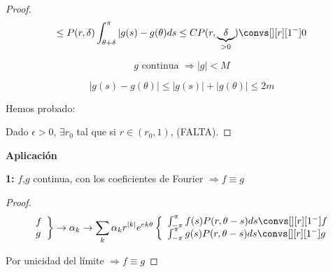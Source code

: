\begin{itemize}
\begin{theorem}
\begin{proof}
					\[\leq P(r, \delta) \int^{\pi}_{\theta+\delta} |g(s) - g(\theta) ds \leq C P(r, \underbrace{\delta}_{> 0}) \convs[][r][1^-] 0  \]

					\[g \text{ continua } \Rightarrow |g| < M \]

					\[ |g(s)  - g(\theta)| \leq |g(s)| + | g(\theta) | \leq 2m \]


					Hemos probado:

					Dado $\epsilon > 0$, $\exists r_0$ tal que si $r \in (r_0,1)$, (FALTA).

				\end{proof}

			\end{theorem}

			\textbf{Aplicación}

			\textbf{1:} $f$,$g$ continua, con los  coeficientes de Fourier $\Rightarrow f \equiv g$

			\begin{proof}
				\[
					\left. \begin{array}{l}
					f \\
					g
					\end{array} \right\} \rightarrow \alpha_k \rightarrow \sum_k \alpha_k r^{|k|} e^{ek\theta} \left\{ \begin{array}{l}
						\int^{\pi}_{-\pi} f(s) P(r, \theta - s)ds \convs[][r][1^-] f \\
						\int^{\pi}_{-\pi} g(s) P(r, \theta - s)ds \convs[][r][1^-] g
					\end{array} \right.
				\]

				Por unicidad del límite $\Rightarrow f \equiv g$
			\end{proof}




		\end{itemize}

